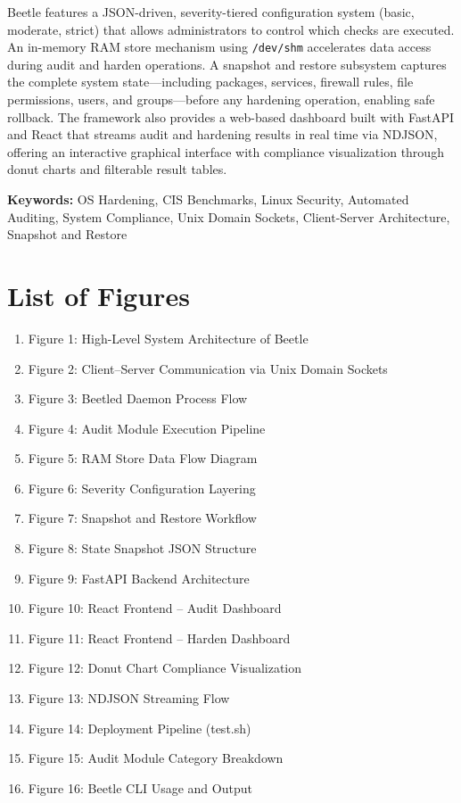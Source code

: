 \documentclass[12pt,oneside,a4paper]{article}
\begin{document}
Beetle features a JSON-driven, severity-tiered configuration system (basic, moderate, strict) that allows administrators to control which checks are executed. An in-memory RAM store mechanism using \texttt{/dev/shm} accelerates data access during audit and harden operations. A snapshot and restore subsystem captures the complete system state---including packages, services, firewall rules, file permissions, users, and groups---before any hardening operation, enabling safe rollback. The framework also provides a web-based dashboard built with FastAPI and React that streams audit and hardening results in real time via NDJSON, offering an interactive graphical interface with compliance visualization through donut charts and filterable result tables.

\textbf{Keywords:} OS Hardening, CIS Benchmarks, Linux Security, Automated Auditing, System Compliance, Unix Domain Sockets, Client-Server Architecture, Snapshot and Restore

\pagebreak
\section*{List of Figures}
\begin{enumerate}
    \item Figure 1: High-Level System Architecture of Beetle
    \item Figure 2: Client--Server Communication via Unix Domain Sockets
    \item Figure 3: Beetled Daemon Process Flow
    \item Figure 4: Audit Module Execution Pipeline
    \item Figure 5: RAM Store Data Flow Diagram
    \item Figure 6: Severity Configuration Layering
    \item Figure 7: Snapshot and Restore Workflow
    \item Figure 8: State Snapshot JSON Structure
    \item Figure 9: FastAPI Backend Architecture
    \item Figure 10: React Frontend -- Audit Dashboard
    \item Figure 11: React Frontend -- Harden Dashboard
    \item Figure 12: Donut Chart Compliance Visualization
    \item Figure 13: NDJSON Streaming Flow
    \item Figure 14: Deployment Pipeline (test.sh)
    \item Figure 15: Audit Module Category Breakdown
    \item Figure 16: Beetle CLI Usage and Output
\end{enumerate}
\end{document}
